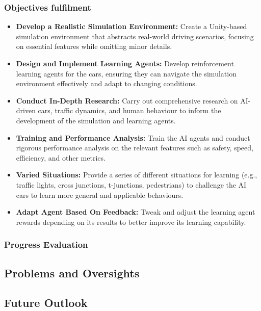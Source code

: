 \documentclass{article}
\begin{document}
\subsubsection{Objectives fulfilment}
\begin{itemize}
\item \textbf{Develop a Realistic Simulation Environment:} Create a Unity-based simulation environment that abstracts real-world driving scenarios, focusing on essential features while omitting minor details.

\item \textbf{Design and Implement Learning Agents:} Develop reinforcement learning agents for the cars, ensuring they can navigate the simulation environment effectively and adapt to changing conditions.

\item \textbf{Conduct In-Depth Research:} Carry out comprehensive research on AI-driven cars, traffic dynamics, and human behaviour to inform the development of the simulation and learning agents.

\item \textbf{Training and Performance Analysis:} Train the AI agents and conduct rigorous performance analysis on the relevant features such as safety, speed, efficiency, and other metrics.

\item \textbf{Varied Situations:} Provide a series of different situations for learning (e.g., traffic lights, cross junctions, t-junctions, pedestrians) to challenge the AI cars to learn more general and applicable behaviours.

\item \textbf{Adapt Agent Based On Feedback:} Tweak and adjust the learning agent rewards depending on its results to better improve its learning capability.

\end{itemize}

\subsubsection{Progress Evaluation}

\subsection{Problems and Oversights}
\lipsum[2][1]

\subsection{Future Outlook}
\lipsum[2][1]



\newpage


 
\end{document}
